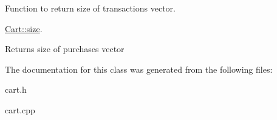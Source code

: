 Function to return size of transactions vector. 

\mbox{\hyperlink{class_cart_ac89333c3766ab987cad13fc430407b78}{Cart\+::size}}.

\begin{DoxyReturn}{Returns}
size of purchases vector 
\end{DoxyReturn}


The documentation for this class was generated from the following files\+:\begin{DoxyCompactItemize}
\item 
cart.\+h\item 
cart.\+cpp\end{DoxyCompactItemize}
